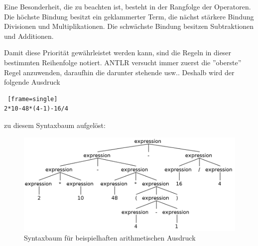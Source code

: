 Eine Besonderheit, die zu beachten ist, besteht in der Rangfolge der Operatoren. Die höchste Bindung besitzt ein geklammerter Term, die nächst stärkere Bindung Divisionen und Multiplikationen. Die schwächste Bindung besitzen Subtraktionen und Additionen.

Damit diese Priorität gewährleistet werden kann, sind die Regeln in dieser bestimmten Reihenfolge notiert. ANTLR versucht immer zuerst die ''oberste'' Regel anzuwenden, daraufhin die darunter stehende usw.. Deshalb wird der folgende Ausdruck 

\begin{lstlisting} [frame=single]
2*10-48*(4-1)-16/4
\end{lstlisting}

zu diesem Syntaxbaum aufgelöst:

\begin{figure}[h!]
\centering
\includegraphics[scale=0.4]{pics/antlr4_parse_tree_arithmetic.png}
\caption{Syntaxbaum für beispielhaften arithmetischen Ausdruck}
\end{figure}

